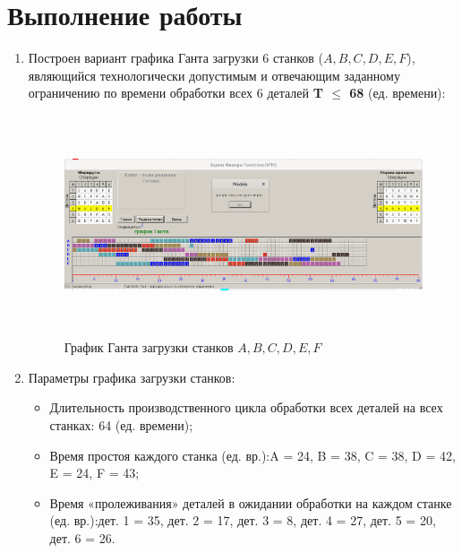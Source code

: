 \documentclass[a4paper,12pt]{article}
\begin{document}
\section{\normalsize{Выполнение работы}}
\begin{flushleft}
  \justify
  \begin{enumerate}
    \item Построен вариант графика Ганта загрузки 6 станков ($A, B, C, D, E, F$), являющийся технологически допустимым и отвечающим заданному ограничению по времени обработки всех 6 деталей \textbf{T $\le$ 68} (ед. времени):
    \begin{figure}[H]
      \includegraphics[width=15.25cm,height=6.5cm]{heuristics.png}
      \centering
      \caption{\small{График Ганта загрузки станков $A, B, C, D, E, F$}}
  \end{figure}
    \item Параметры графика загрузки станков:
    \begin{itemize}
      \item Длительность производственного цикла обработки всех деталей на всех станках: 64 (ед. времени);
      \item Время простоя каждого станка (ед. вр.):\newline A = 24, B = 38, C = 38, D = 42, E = 24, F = 43;
      \item Время «пролеживания» деталей в ожидании обработки на каждом станке (ед. вр.):\newline дет. 1 = 35, дет. 2 = 17, дет. 3 = 8, дет. 4 = 27, дет. 5 = 20, дет. 6 = 26.
    \end{itemize}
  \end{enumerate}
\end{flushleft}
\end{document}
